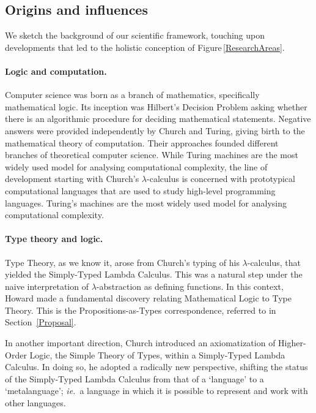 \documentclass[11pt,twocolumn]{article}
\newcommand{\ie}{\emph{ie.}}
\newcommand{\lcalculus}{\mbox{$\lambda$-calculus}}
\begin{document}
\subsection{Origins and influences}
\label{Origins}

We sketch the background of our scientific framework, 
touching upon %
developments that led to the holistic conception of
Figure\,\ref{ResearchAreas}.


\paragraph*{Logic and computation.}

Computer science was born as a branch of mathematics, specifically
mathematical logic.  Its inception was Hilbert's %
Decision Problem asking whether there is an algorithmic procedure for
deciding mathematical statements.  Negative answers were provided
independently by Church %
and Turing, %
giving birth to the mathematical theory of computation.  Their approaches
founded different branches of theoretical computer science.  
While Turing machines are the most widely used model for analysing
computational complexity, the line of development starting with Church's
{\lcalculus} is concerned with prototypical computational languages that
are used to study high-level programming languages.  
Turing's machines %
are the most widely used model for analysing computational complexity.

\paragraph*{Type theory and logic.}
\label{SectionATypeTheoryAndLogicParagraph}

Type Theory, as we %
know it, arose from Church's typing of
his \lcalculus, that yielded the 
Simply-Typed Lambda Calculus. %
This was a natural step under the naive interpretation of
\mbox{$\lambda$-abstraction} as defining functions.  In this
context,
Howard %
made a fundamental discovery relating Mathematical Logic to Type Theory.
This is the Prop\-o\-si\-tions-as-Types correspondence, referred to
in Section~\ref{Proposal}.

In another %
important direction, Church introduced 
an axiomatization of Higher-Order Logic, the 
Simple Theory of Types, %
within a Simply-Typed Lambda Calculus.  In doing so, he adopted a
radically new perspective, shifting the status of the Simply-Typed Lambda
Calculus from that of a `language' to a `metalanguage'; \ie~a language in
which it is possible to represent and work with other languages. 
\end{document}
